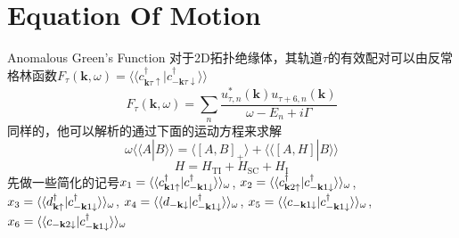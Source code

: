 \documentclass[10pt,aspectratio=169]{beamer} %
\begin{document}
\section{Equation Of Motion}
\begin{frame}{Anomalous Green's Function}
对于2D拓扑绝缘体，其轨道$\tau$的有效配对可以由反常格林函数$F_\tau(\mathbf{k},\omega)=\langle\langle c^\dagger_{\mathbf{k}\tau\uparrow}|c^\dagger_{\mathbf{-k}\tau\downarrow}\rangle\rangle$
\begin{equation}
F_\tau(\mathbf{k},\omega)=\sum_n\frac{u^{*}_{\tau,n}(\mathbf{k})u_{\tau+6,n}(\mathbf{k})}{\omega-E_n+i\Gamma}\label{af1}
\end{equation}
同样的，他可以解析的通过下面的运动方程来求解
\begin{equation}
\omega\langle\langle A|B\rangle\rangle=\langle\left[A,B\right]_{+}\rangle+\langle\langle\left[A,H\right]|B\rangle\rangle\label{gf11}
\end{equation}
\begin{equation}
H=H_\mathrm{TI}+H_\mathrm{SC}+H_\mathrm{I}\label{ham}
\end{equation}
先做一些简化的记号$x_1=\langle\langle c_{{\bf k}1\uparrow}^\dagger|c_{-{\bf k}1\downarrow}^\dagger\rangle\rangle_\omega$,
$x_2 = \langle\langle c_{{\bf k}2\uparrow}^\dagger|c_{-{\bf k}1\downarrow}^\dagger\rangle\rangle_\omega$,
$x_3 = \langle\langle d_{{\bf k}\uparrow}^\dagger|c_{-{\bf k}1\downarrow}^\dagger\rangle\rangle_\omega$,
$x_4 = \langle\langle d_{-{\bf k}\downarrow}|c_{-{\bf k}1\downarrow}^\dagger\rangle\rangle_\omega$,
$x_5 = \langle\langle c_{-{\bf k}1\downarrow}|c_{-{\bf k}1\downarrow}^\dagger\rangle\rangle_\omega$,
$x_6 = \langle\langle c_{-{\bf k}2\downarrow}|c_{-{\bf k}1\downarrow}^\dagger\rangle\rangle_\omega$
\end{frame}
\end{document}
